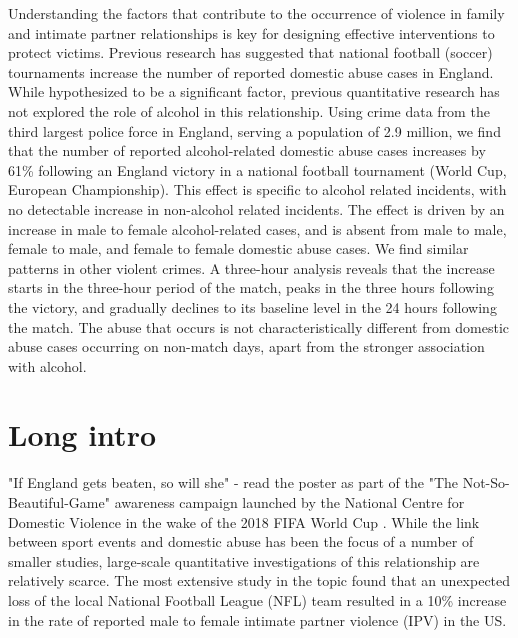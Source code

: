\documentclass[12pt, letterpaper]{article}
\begin{document}
Understanding the factors that contribute to the occurrence of violence in family and intimate partner relationships is key for designing effective interventions to protect victims. Previous research has suggested that national football (soccer) tournaments increase the number of reported domestic abuse cases in England\autocite{Kirby2014, Brimicombe2012}. While hypothesized to be a significant factor, previous quantitative research has not explored the role of alcohol in this relationship. Using crime data from the third largest police force in England, serving a population of 2.9 million\autocite{populationfigure}, we find that the number of reported alcohol-related domestic abuse cases increases by 61\% following an England victory in a national football tournament (World Cup, European Championship). This effect is specific to alcohol related incidents, with no detectable increase in non-alcohol related incidents. The effect is driven by an increase in male to female alcohol-related cases, and is absent from male to male, female to male, and female to female domestic abuse cases. We find similar patterns in other violent crimes. A three-hour analysis reveals that the increase starts in the three-hour period of the match, peaks in the three hours following the victory, and gradually declines to its baseline level in the 24 hours following the match. The abuse that occurs is not characteristically different from domestic abuse cases occurring on non-match days, apart from the stronger association with alcohol. 

\section{Long intro}

"If England gets beaten, so will she" - read the poster as part of the "The Not-So-Beautiful-Game" awareness campaign launched by the National Centre for Domestic Violence in the wake of the 2018 FIFA World Cup \autocite{NCDV}. While the link between sport events and domestic abuse has been the focus of a number of smaller studies\autocite{Williams2014}, large-scale quantitative investigations of this relationship are relatively scarce. The most extensive study in the topic found that an unexpected loss of the local National Football League (NFL) team resulted in a 10\% increase in the rate of reported male to female intimate partner violence (IPV) in the US\autocite{Card2011}. 
\end{document}
